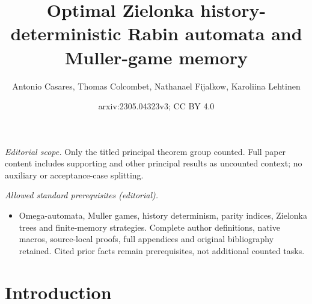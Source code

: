 \documentclass[10pt,a4paper]{amsart}
\title{Optimal Zielonka history-deterministic Rabin automata and Muller-game memory}
\author{Antonio Casares, Thomas Colcombet, Nathanael Fijalkow, Karoliina Lehtinen}
\date{arxiv:2305.04323v3; CC BY 4.0}
\begin{document}
\maketitle
\noindent\textit{Editorial scope.} Only the titled principal theorem group counted. Full paper content includes supporting and other principal results as uncounted context; no auxiliary or acceptance-case splitting.\par\medskip
\noindent\textit{Allowed standard prerequisites (editorial).}\begin{itemize}
\item Omega-automata, Muller games, history determinism, parity indices, Zielonka trees and finite-memory strategies. Complete author definitions, native macros, source-local proofs, full appendices and original bibliography retained. Cited prior facts remain prerequisites, not additional counted tasks.
\end{itemize}\medskip
	\section{Introduction}\label{section:introduction}
\end{document}
